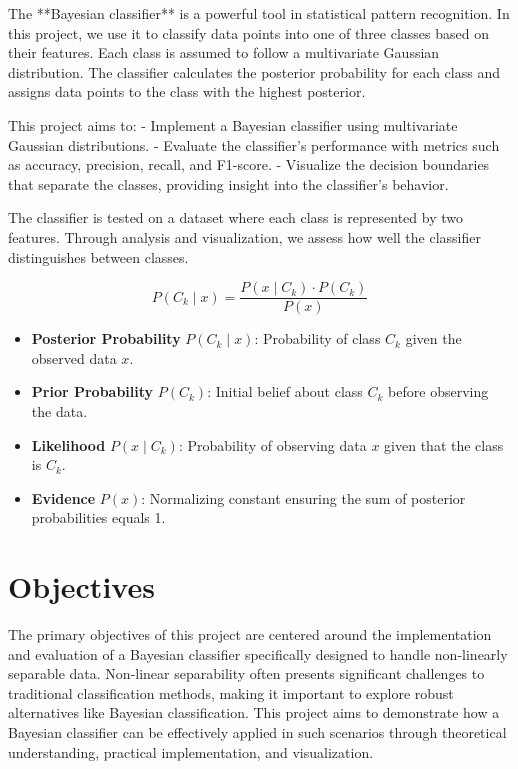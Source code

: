 \documentclass[conference]{IEEEtran}
\begin{document}
	The **Bayesian classifier** is a powerful tool in statistical pattern recognition. In this project, we use it to classify data points into one of three classes based on their features. Each class is assumed to follow a multivariate Gaussian distribution. The classifier calculates the posterior probability for each class and assigns data points to the class with the highest posterior.
	
	This project aims to:
	- Implement a Bayesian classifier using multivariate Gaussian distributions.
	- Evaluate the classifier's performance with metrics such as accuracy, precision, recall, and F1-score.
	- Visualize the decision boundaries that separate the classes, providing insight into the classifier's behavior.
	
	The classifier is tested on a dataset where each class is represented by two features. Through analysis and visualization, we assess how well the classifier distinguishes between classes.
	
	\[
	P(C_k \mid x) = \frac{P(x \mid C_k) \cdot P(C_k)}{P(x)}
	\]
	
	\begin{itemize}
		\item \textbf{Posterior Probability} \( P(C_k \mid x) \): Probability of class \( C_k \) given the observed data \( x \).
		\item \textbf{Prior Probability} \( P(C_k) \): Initial belief about class \( C_k \) before observing the data.
		\item \textbf{Likelihood} \( P(x \mid C_k) \): Probability of observing data \( x \) given that the class is \( C_k \).
		\item \textbf{Evidence} \( P(x) \): Normalizing constant ensuring the sum of posterior probabilities equals 1.
	\end{itemize}
	
\section{Objectives}

The primary objectives of this project are centered around the implementation and evaluation of a Bayesian classifier specifically designed to handle non-linearly separable data. Non-linear separability often presents significant challenges to traditional classification methods, making it important to explore robust alternatives like Bayesian classification. This project aims to demonstrate how a Bayesian classifier can be effectively applied in such scenarios through theoretical understanding, practical implementation, and visualization.
\end{document}
